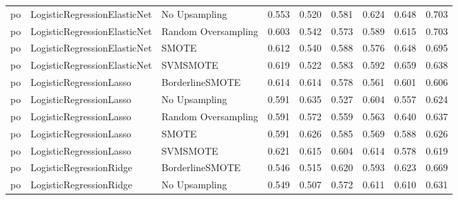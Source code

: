 \begin{tabular}{lllllllll}
      po & LogisticRegressionElasticNet &       No Upsampling & 0.553 &                     0.520 &                 0.581 &                  0.624 &                                   0.648 &     0.703 \\
      po & LogisticRegressionElasticNet & Random Oversampling & 0.603 &                     0.542 &                 0.573 &                  0.589 &                                   0.615 &     0.703 \\
      po & LogisticRegressionElasticNet &               SMOTE & 0.612 &                     0.540 &                 0.588 &                  0.576 &                                   0.648 &     0.695 \\
      po & LogisticRegressionElasticNet &            SVMSMOTE & 0.619 &                     0.522 &                 0.583 &                  0.592 &                                   0.659 &     0.638 \\
      po &      LogisticRegressionLasso &     BorderlineSMOTE & 0.614 &                     0.614 &                 0.578 &                  0.561 &                                   0.601 &     0.606 \\
      po &      LogisticRegressionLasso &       No Upsampling & 0.591 &                     0.635 &                 0.527 &                  0.604 &                                   0.557 &     0.624 \\
      po &      LogisticRegressionLasso & Random Oversampling & 0.591 &                     0.572 &                 0.559 &                  0.563 &                                   0.640 &     0.637 \\
      po &      LogisticRegressionLasso &               SMOTE & 0.591 &                     0.626 &                 0.585 &                  0.569 &                                   0.588 &     0.626 \\
      po &      LogisticRegressionLasso &            SVMSMOTE & 0.621 &                     0.615 &                 0.604 &                  0.614 &                                   0.578 &     0.619 \\
      po &      LogisticRegressionRidge &     BorderlineSMOTE & 0.546 &                     0.515 &                 0.620 &                  0.593 &                                   0.623 &     0.669 \\
      po &      LogisticRegressionRidge &       No Upsampling & 0.549 &                     0.507 &                 0.572 &                  0.611 &                                   0.610 &     0.631 \\

\end{tabular}

